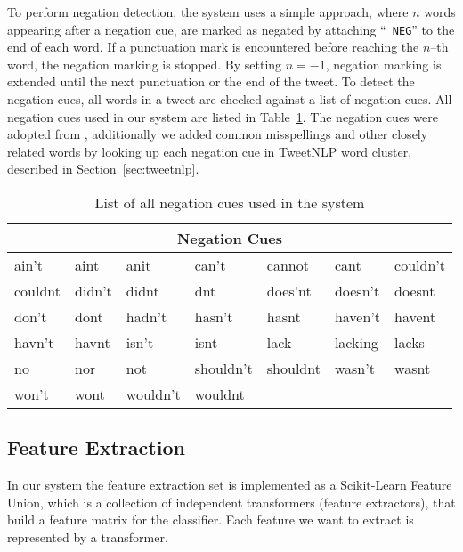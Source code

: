 To perform negation detection, the system uses a simple approach, where $n$ words appearing after a negation cue, are marked as negated by attaching ``\texttt{\_NEG}'' to the end of each word. If a punctuation mark is encountered before reaching the $n$--th word, the negation marking is stopped. By setting $n=-1$, negation marking is extended until the next punctuation or the end of the tweet. To detect the negation cues, all words in a tweet are checked against a list of negation cues. All negation cues used in our system are listed in Table~\ref{tab:negation_cues}. The negation cues were adopted from \cite{Councill10}, additionally we added common misspellings and other closely related words by looking up each negation cue in TweetNLP word cluster, described in Section~\ref{sec:tweetnlp}.

\noindent\begin{table}[t]
    \begin{tabular}{| l | l | l | l | l | l | l |}
        \hline
        \multicolumn{7}{|c|}{\textbf{Negation Cues}} \\ \hline
        ain't & aint & anit & can't & cannot & cant & couldn't \\ \hline
        couldnt & didn't & didnt & dnt & does'nt & doesn't & doesnt \\ \hline
        don't & dont & hadn't & hasn't & hasnt & haven't & havent \\ \hline
        havn't & havnt & isn't & isnt & lack & lacking & lacks \\ \hline
        no & nor & not & shouldn't & shouldnt & wasn't & wasnt\\ \hline
        won't & wont & wouldn't & wouldnt & \multicolumn{3}{c|}{} \\ \hline
    \end{tabular}
    \caption{List of all negation cues used in the system}
    \label{tab:negation_cues}
\end{table}


\subsection{Feature Extraction}
\label{sec:feature_extraction}
In our system the feature extraction set is implemented as a Scikit-Learn Feature Union, which is a collection of independent transformers (feature extractors), that build a feature matrix for the classifier. Each feature we want to extract is represented by a transformer.


